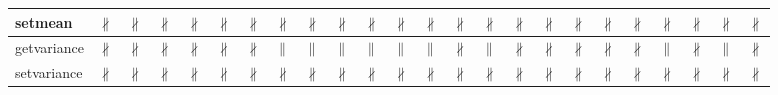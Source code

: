 \documentclass[10pt]{article}
\begin{document}
\begin{longtable}{|l|l|l|l|l|l|l|l|l|l|l|l|l|l|l|l|l|l|l|l|l|l|l|l|}
\hline
setmean&{\color{BrickRed}$\nparallel$}&{\color{BrickRed}$\nparallel$}&{\color{BrickRed}$\nparallel$}&{\color{BrickRed}$\nparallel$}&{\color{BrickRed}$\nparallel$}&{\color{BrickRed}$\nparallel$}&{\color{BrickRed}$\nparallel$}&{\color{BrickRed}$\nparallel$}&{\color{BrickRed}$\nparallel$}&{\color{BrickRed}$\nparallel$}&{\color{BrickRed}$\nparallel$}&{\color{BrickRed}$\nparallel$}&{\color{BrickRed}$\nparallel$}&{\color{BrickRed}$\nparallel$}&{\color{BrickRed}$\nparallel$}&{\color{BrickRed}$\nparallel$}&{\color{BrickRed}$\nparallel$}&{\color{BrickRed}$\nparallel$}&{\color{BrickRed}$\nparallel$}&{\color{BrickRed}$\nparallel$}&{\color{BrickRed}$\nparallel$}&{\color{BrickRed}$\nparallel$}&{\color{BrickRed}$\nparallel$}\\
\hline
getvariance&{\color{BrickRed}$\nparallel$}&{\color{BrickRed}$\nparallel$}&{\color{BrickRed}$\nparallel$}&{\color{BrickRed}$\nparallel$}&{\color{BrickRed}$\nparallel$}&{\color{BrickRed}$\nparallel$}&{\color{blue}$\parallel$}&{\color{blue}$\parallel$}&{\color{blue}$\parallel$}&{\color{blue}$\parallel$}&{\color{blue}$\parallel$}&{\color{blue}$\parallel$}&{\color{BrickRed}$\nparallel$}&{\color{blue}$\parallel$}&{\color{BrickRed}$\nparallel$}&{\color{BrickRed}$\nparallel$}&{\color{BrickRed}$\nparallel$}&{\color{BrickRed}$\nparallel$}&{\color{BrickRed}$\nparallel$}&{\color{blue}$\parallel$}&{\color{BrickRed}$\nparallel$}&{\color{blue}$\parallel$}&{\color{BrickRed}$\nparallel$}\\
\hline
setvariance&{\color{BrickRed}$\nparallel$}&{\color{BrickRed}$\nparallel$}&{\color{BrickRed}$\nparallel$}&{\color{BrickRed}$\nparallel$}&{\color{BrickRed}$\nparallel$}&{\color{BrickRed}$\nparallel$}&{\color{BrickRed}$\nparallel$}&{\color{BrickRed}$\nparallel$}&{\color{BrickRed}$\nparallel$}&{\color{BrickRed}$\nparallel$}&{\color{BrickRed}$\nparallel$}&{\color{BrickRed}$\nparallel$}&{\color{BrickRed}$\nparallel$}&{\color{BrickRed}$\nparallel$}&{\color{BrickRed}$\nparallel$}&{\color{BrickRed}$\nparallel$}&{\color{BrickRed}$\nparallel$}&{\color{BrickRed}$\nparallel$}&{\color{BrickRed}$\nparallel$}&{\color{BrickRed}$\nparallel$}&{\color{BrickRed}$\nparallel$}&{\color{BrickRed}$\nparallel$}&{\color{BrickRed}$\nparallel$}\\
\hline
\end{longtable}
\newpage
\end{document}
